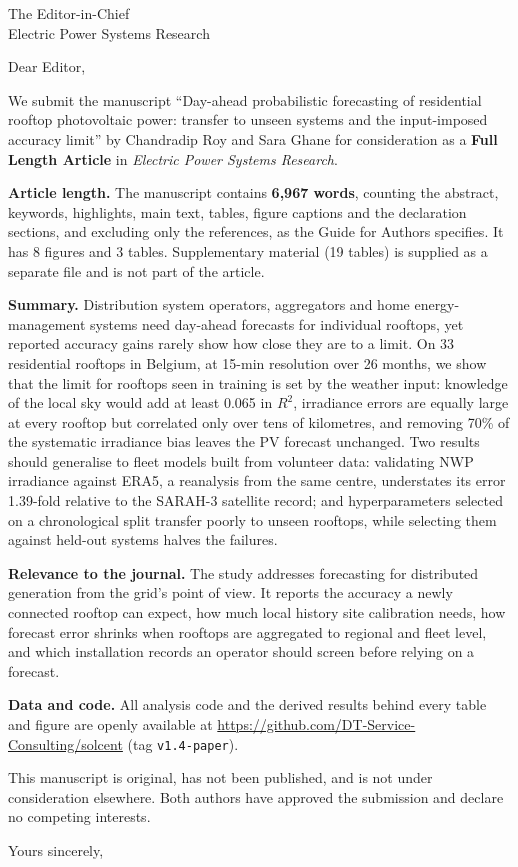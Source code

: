 \documentclass[11pt]{letter}
\begin{document}
\begin{letter}{The Editor-in-Chief\\Electric Power Systems Research}

\opening{Dear Editor,}

We submit the manuscript ``Day-ahead probabilistic forecasting of residential rooftop photovoltaic power: transfer to unseen systems and the input-imposed accuracy limit'' by Chandradip Roy and Sara Ghane for consideration as a \textbf{Full Length Article} in \emph{Electric Power Systems Research}.

\textbf{Article length.} The manuscript contains \textbf{6,967 words}, counting the abstract, keywords, highlights, main text, tables, figure captions and the declaration sections, and excluding only the references, as the Guide for Authors specifies. It has 8 figures and 3 tables. Supplementary material (19 tables) is supplied as a separate file and is not part of the article.

\textbf{Summary.} Distribution system operators, aggregators and home energy-management systems need day-ahead forecasts for individual rooftops, yet reported accuracy gains rarely show how close they are to a limit. On 33 residential rooftops in Belgium, at 15-min resolution over 26 months, we show that the limit for rooftops seen in training is set by the weather input: knowledge of the local sky would add at least 0.065 in $R^2$, irradiance errors are equally large at every rooftop but correlated only over tens of kilometres, and removing 70\% of the systematic irradiance bias leaves the PV forecast unchanged. Two results should generalise to fleet models built from volunteer data: validating NWP irradiance against ERA5, a reanalysis from the same centre, understates its error 1.39-fold relative to the SARAH-3 satellite record; and hyperparameters selected on a chronological split transfer poorly to unseen rooftops, while selecting them against held-out systems halves the failures.

\textbf{Relevance to the journal.} The study addresses forecasting for distributed generation from the grid's point of view. It reports the accuracy a newly connected rooftop can expect, how much local history site calibration needs, how forecast error shrinks when rooftops are aggregated to regional and fleet level, and which installation records an operator should screen before relying on a forecast.

\textbf{Data and code.} All analysis code and the derived results behind every table and figure are openly available at \url{https://github.com/DT-Service-Consulting/solcent} (tag \texttt{v1.4-paper}).

This manuscript is original, has not been published, and is not under consideration elsewhere. Both authors have approved the submission and declare no competing interests.

\closing{Yours sincerely,}

\end{letter}
\end{document}
